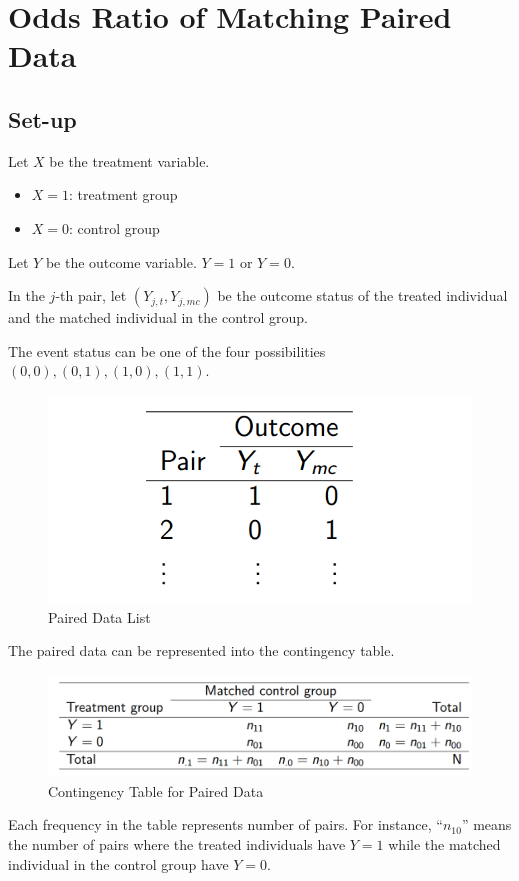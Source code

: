 \section{Odds Ratio of Matching Paired Data}
\subsection{Set-up}
Let $X$ be the treatment variable.
\begin{itemize}
	\item $X = 1$: treatment group
	\item $X = 0$: control group
\end{itemize}

Let $Y$ be the outcome variable. $Y = 1$ or $Y = 0$.

In the $j$-th pair, let $(Y_{j,t}, Y_{j, mc})$ be the outcome status of the treated individual and the matched individual in the control group.

The event status can be one of the four possibilities $(0, 0), (0, 1), (1, 0), (1, 1)$.

\begin{figure}[H]
	\centering
	\includegraphics[width=0.5\linewidth]{fig/screenshot006}
	\caption{Paired Data List}
	\label{fig:screenshot006}
\end{figure}

The paired data can be represented into the contingency table.
\begin{figure}[H]
	\centering
	\includegraphics[width=0.7\linewidth]{fig/screenshot007}
	\caption{Contingency Table for Paired Data}
	\label{fig:screenshot007}
\end{figure}

Each frequency in the table represents number of pairs.
For instance, ``$n_{10}$'' means the number of pairs where the treated individuals have $Y= 1$ while the matched individual in the control group have $Y= 0$.

